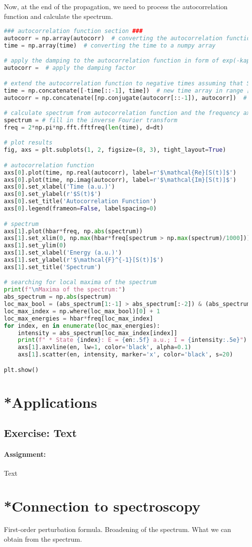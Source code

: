 Now, at the end of the propagation, we need to process the autocorrelation function and calculate the spectrum. 
\begin{lstlisting}[language=Python, style=mystyle2]
### autocorrelation function section ###
autocorr = np.array(autocorr)  # converting the autocorrelation function to a numpy array
time = np.array(time)  # converting the time to a numpy array

# apply the damping to the autocorrelation function in form of exp(-kappa*time)
autocorr =  # apply the damping factor

# extend the autocorrelation function to negative times assuming that S(t) = S^*(-t)
time = np.concatenate([-time[::-1], time])  # new time array in range [-t_max, t_max]
autocorr = np.concatenate([np.conjugate(autocorr[::-1]), autocorr])  # new symmetric autocorr in range [-t_max, t_max]

# calculate spectrum from autocorrelation function and the frequency axis corresponding to it
spectrum = # fill in the inverse Fourier transform
freq = 2*np.pi*np.fft.fftfreq(len(time), d=dt)

# plot results
fig, axs = plt.subplots(1, 2, figsize=(8, 3), tight_layout=True)

# autocorrelation function
axs[0].plot(time, np.real(autocorr), label=r'$\mathcal{Re}[S(t)]$')
axs[0].plot(time, np.imag(autocorr), label=r'$\mathcal{Im}[S(t)]$')
axs[0].set_xlabel('Time (a.u.)')
axs[0].set_ylabel(r'$S(t)$')
axs[0].set_title('Autocorrelation Function')
axs[0].legend(frameon=False, labelspacing=0)

# spectrum
axs[1].plot(hbar*freq, np.abs(spectrum))
axs[1].set_xlim(0, np.max(hbar*freq[spectrum > np.max(spectrum)/1000]))
axs[1].set_ylim(0)
axs[1].set_xlabel('Energy (a.u.)')
axs[1].set_ylabel(r'$\mathcal{F}^{-1}[S(t)]$')
axs[1].set_title('Spectrum')

# searching for local maxima of the spectrum
print(f"\nMaxima of the spectrum:")
abs_spectrum = np.abs(spectrum)
loc_max_bool = (abs_spectrum[1:-1] > abs_spectrum[:-2]) & (abs_spectrum[1:-1] > abs_spectrum[2:])
loc_max_index = np.where(loc_max_bool)[0] + 1
loc_max_energies = hbar*freq[loc_max_index]
for index, en in enumerate(loc_max_energies):
    intensity = abs_spectrum[loc_max_index[index]]
    print(f" * State {index}: E = {en:.5f} a.u.; I = {intensity:.5e}")
    axs[1].axvline(en, lw=1, color='black', alpha=0.1)
    axs[1].scatter(en, intensity, marker='x', color='black', s=20)

plt.show()
\end{lstlisting}

\section{*Applications}

\subsection*{Exercise: Text}

\paragraph{Assignment:} Text

\section{*Connection to spectroscopy}

First-order perturbation formula. Broadening of the spectrum. What we can obtain from the spectrum.